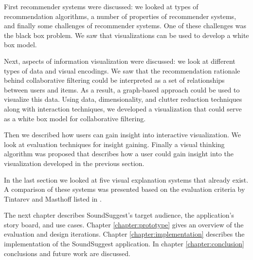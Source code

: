 First recommender systems were discussed: we looked at types of recommendation algorithms, a number of properties of recommender systems, and finally some challenges of recommender systems. One of these challenges was the black box problem. We saw that visualizations can be used to develop a white box model.

Next, aspects of information visualization were discussed: we look at different types of data and visual encodings. We saw that the recommendation rationale behind collaborative filtering could be interpreted as a set of relationships between users and items. As a result, a graph-based approach could be used to visualize this data. Using data, dimensionality, and clutter reduction techniques along with interaction techniques, we developed a visualization that could serve as a white box model for collaborative filtering.

Then we described how users can gain insight into interactive visualization. We look at evaluation techniques for insight gaining. Finally a visual thinking algorithm was proposed that describes how a user could gain insight into the visualization developed in the previous section.

In the last section we looked at five visual explanation systems that already exist. A comparison of these systems was presented based on the evaluation criteria by Tintarev and Masthoff listed in \cite{tintarev:2007:SER:1547550.1547664}.

The next chapter describes SoundSuggest's target audience, the application's story board, and use cases. Chapter \ref{chapter:prototype} gives an overview of the evaluation and design iterations. Chapter \ref{chapter:implementation} describes the implementation of the SoundSuggest application. In chapter \ref{chapter:conclusion} conclusions and future work are discussed.





